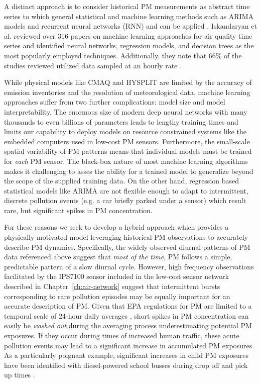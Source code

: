 A distinct approach is to consider historical PM measurements as abstract time
series to which general statistical and machine learning methods such as
ARIMA models and recurrent neural networks (RNN) and can be applied
\cite{intro-to-time-series-models, time-series-rnns}.
Iskandaryan et al. reviewed over 316 papers on machine learning approaches for
air quality time series and identified neural networks, regression
models, and decision trees as the most popularly employed techniques.
Additionally, they note that 66\% of the studies reviewed utilized data sampled
at an hourly rate \cite{iskandaryan-2020}.

While physical models like CMAQ and HYSPLIT are limited by the accuracy of
emission inventories and the resolution of meteorological data, machine learning
approaches suffer from two further complications: model size and model
interpretability. The enormous size of modern deep neural networks with
many thousands to even billions of parameters leads to lengthy training times and limits
our capability to deploy models on resource constrained systems like the
embedded computers used in low-cost PM sensors. Furthermore, the small-scale
spatial variability of PM patterns means that individual models must be trained for
\textit{each} PM sensor. The black-box nature of most machine
learning algorithms makes it challenging to asses the ability for a trained
model to generalize beyond the scope of the supplied training data.  On the other
hand, regression based statistical models like ARIMA are not flexible enough to
adapt to intermittent, discrete pollution events (e.g. a car briefly parked
under a sensor) which result rare, but significant spikes in PM concentration.

For these reasons we seek to develop a hybrid approach which provides a
physically motivated model leveraging historical PM observations to
accurately describe PM dynamics. Specifically, the widely observed diurnal patterns
of PM data referenced above suggest that \textit{most of the time}, PM
follows a simple, predictable pattern of a slow diurnal cycle. However, high
frequency observations facilitated by the IPS7100 sensor included in the
low-cost sensor network described in Chapter~\ref{ch:air-network} suggest that
intermittent bursts corresponding to rare pollution episodes may be equally
important for an accurate description of PM. Given that EPA regulations for PM
are limited to a temporal scale of 24-hour daily averages \cite{epa-standards},
short spikes in PM concentration can easily be \textit{washed out} during the
averaging process underestimating potential PM exposures. If they occur during
times of increased human traffic, these acute pollution events may lead to a
significant increase in accumulated PM exposures. As a particularly poignant
example, significant increases in child PM exposures have been identified with
diesel-powered school busses during drop off and pick up times
\cite{school-pm-exposure}.

